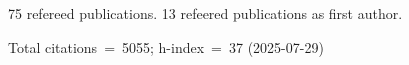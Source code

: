 75 refereed publications. 13 refeered publications as first author.

Total citations~=~5055; h-index~=~37 (2025-07-29)